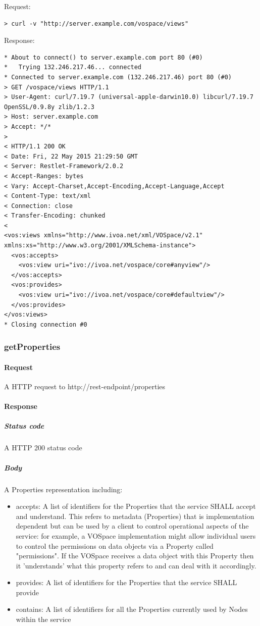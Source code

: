 \documentclass[11pt,a4paper]{ivoa}
\begin{document}
\noindent
Request:
\begin{lstlisting}
> curl -v "http://server.example.com/vospace/views"
\end{lstlisting}
Response:
\begin{lstlisting}
* About to connect() to server.example.com port 80 (#0)
*   Trying 132.246.217.46... connected
* Connected to server.example.com (132.246.217.46) port 80 (#0)
> GET /vospace/views HTTP/1.1
> User-Agent: curl/7.19.7 (universal-apple-darwin10.0) libcurl/7.19.7 OpenSSL/0.9.8y zlib/1.2.3
> Host: server.example.com
> Accept: */*
>
< HTTP/1.1 200 OK
< Date: Fri, 22 May 2015 21:29:50 GMT
< Server: Restlet-Framework/2.0.2
< Accept-Ranges: bytes
< Vary: Accept-Charset,Accept-Encoding,Accept-Language,Accept
< Content-Type: text/xml
< Connection: close
< Transfer-Encoding: chunked
<
<vos:views xmlns="http://www.ivoa.net/xml/VOSpace/v2.1" xmlns:xs="http://www.w3.org/2001/XMLSchema-instance">
  <vos:accepts>
    <vos:view uri="ivo://ivoa.net/vospace/core#anyview"/>
  </vos:accepts>
  <vos:provides>
    <vos:view uri="ivo://ivoa.net/vospace/core#defaultview"/>
  </vos:provides>
</vos:views>
* Closing connection #0
\end{lstlisting}

\subsubsection{getProperties}
\label{subsubsec:getproperties}

\paragraph{Request}
A HTTP request to http://rest-endpoint/properties

\paragraph{Response}
\subparagraph{Status code} A HTTP 200 status code
\subparagraph{Body}
A Properties representation including:
\begin{itemize}
    \item accepts: A list of identifiers for the Properties that the service SHALL accept and understand. This refers to metadata (Properties) that is implementation dependent but can be used by a client to control operational aspects of the service: for example, a VOSpace implementation might allow individual users to control the permissions on data objects via a Property called "permissions". If the VOSpace receives a data object with this Property then it 'understands' what this property refers to and can deal with it accordingly.
    \item provides: A list of identifiers for the Properties that the service SHALL provide
    \item contains: A list of identifiers for all the Properties currently used by Nodes within the service
\end{itemize}
\end{document}
